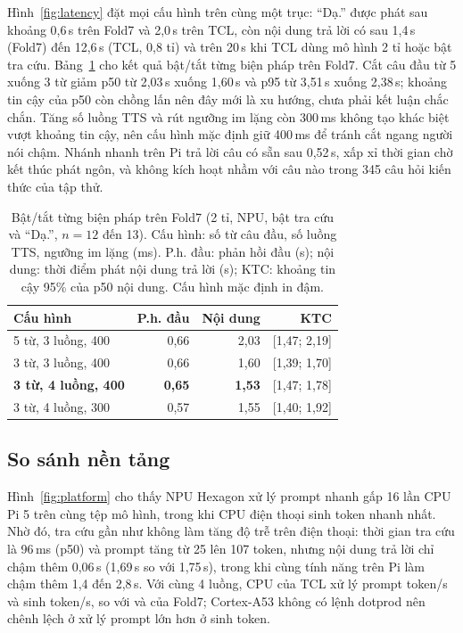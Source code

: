 \documentclass[a4paper,12pt,twocolumn]{article}
\begin{document}
Hình~\ref{fig:latency} đặt mọi cấu hình trên cùng một trục: ``Dạ.'' được phát sau khoảng 0,6\,s trên Fold7 và 2,0\,s trên TCL, còn nội dung trả lời có sau 1,4\,s (Fold7) đến 12,6\,s (TCL, 0,8 tỉ) và trên 20\,s khi TCL dùng mô hình 2 tỉ hoặc bật tra cứu. Bảng~\ref{tab:abl} cho kết quả bật/tắt từng biện pháp trên Fold7. Cắt câu đầu từ 5 xuống 3 từ giảm p50 từ 2,03\,s xuống 1,60\,s và p95 từ 3,51\,s xuống 2,38\,s; khoảng tin cậy của p50 còn chồng lấn nên đây mới là xu hướng, chưa phải kết luận chắc chắn. Tăng số luồng TTS và rút ngưỡng im lặng còn 300\,ms không tạo khác biệt vượt khoảng tin cậy, nên cấu hình mặc định giữ 400\,ms để tránh cắt ngang người nói chậm. Nhánh nhanh trên Pi trả lời câu có sẵn sau 0,52\,s, xấp xỉ thời gian chờ kết thúc phát ngôn, và không kích hoạt nhầm với câu nào trong 345 câu hỏi kiến thức của tập thử.

\begin{table}[t]\centering\small
\caption{Bật/tắt từng biện pháp trên Fold7 (2 tỉ, NPU, bật tra cứu và ``Dạ.'', $n=12$ đến 13). Cấu hình: số từ câu đầu, số luồng TTS, ngưỡng im lặng (ms). P.h. đầu: phản hồi đầu (s); nội dung: thời điểm phát nội dung trả lời (s); KTC: khoảng tin cậy 95\% của p50 nội dung. Cấu hình mặc định in đậm.}\label{tab:abl}
\setlength{\tabcolsep}{3pt}
\begin{tabular}{@{}lrrr@{}}\toprule
Cấu hình & P.h. đầu & Nội dung & KTC\\\midrule
5 từ, 3 luồng, 400 & 0,66 & 2,03 & [1,47; 2,19]\\
3 từ, 3 luồng, 400 & 0,66 & 1,60 & [1,39; 1,70]\\
\textbf{3 từ, 4 luồng, 400} & \textbf{0,65} & \textbf{1,53} & [1,47; 1,78]\\
3 từ, 4 luồng, 300 & 0,57 & 1,55 & [1,40; 1,92]\\\bottomrule
\end{tabular}
\end{table}

\subsection{So sánh nền tảng}\label{sec:platform}
Hình~\ref{fig:platform} cho thấy NPU Hexagon xử lý prompt nhanh gấp 16 lần CPU Pi 5 trên cùng tệp mô hình, trong khi CPU điện thoại sinh token nhanh nhất. Nhờ đó, tra cứu gần như không làm tăng độ trễ trên điện thoại: thời gian tra cứu là 96\,ms (p50) và prompt tăng từ 25 lên 107 token, nhưng nội dung trả lời chỉ chậm thêm 0,06\,s (1,69\,s so với 1,75\,s), trong khi cùng tính năng trên Pi làm chậm thêm 1,4 đến 2,8\,s. Với cùng 4 luồng, CPU của TCL xử lý prompt \hmPpT{} token/s và sinh \hmTgT{} token/s, so với \hmPpF{} và \hmTgF{} của Fold7; Cortex-A53 không có lệnh dotprod nên chênh lệch ở xử lý prompt lớn hơn ở sinh token.
\end{document}
